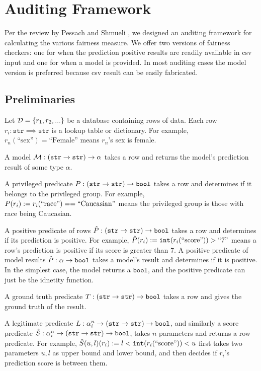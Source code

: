 \documentclass[conference]{IEEEtran}
\begin{document}
\section{Auditing Framework}
\label{sec:framework}
Per the review by Pessach and Shmueli \cite{pessach2022review}, we designed an auditing framework for calculating the various fairness measure. We offer two versions of fairness checkers: one for when the prediction positive results are readily available in csv input and one for when a model is provided. In most auditing cases the model version is preferred because csv result can be easily fabricated.

\subsection{Preliminaries}
Let $\mathcal{D} = \{r_1, r_2, ...\}$ be a database containing rows of data. Each row $r_i : \mathtt{str} \implies \mathtt{str}$ is a lookup table or dictionary. For example, $r_n(\text{``sex''}) = \text{``Female''}$ means $r_n$'s sex is female.

A model $\mathcal{M} : (\mathtt{str} \rightarrow \mathtt{str}) \rightarrow \alpha$ takes a row and returns the model's prediction result of some type $\alpha$.

A privileged predicate $P : (\mathtt{str} \rightarrow \mathtt{str}) \rightarrow \mathtt{bool}$ takes a row and determines if it belongs to the privileged group. For example, $P(r_i) := r_i(\text{``race''}) == \text{``Caucasian''}$ means the privileged group is those with race being Caucasian.

A positive predicate of rows $\hat{P} : (\mathtt{str} \rightarrow \mathtt{str}) \rightarrow \mathtt{bool}$ takes a row and determines if its prediction is positive. For example, $\hat{P}(r_i) := \mathtt{int}(r_i(\text{``score''})) > \text{``7''}$ means a row's prediction is positive if its score is greater than 7. A positive predicate of model results $\hat{P} : \alpha \rightarrow \mathtt{bool}$ takes a model's result and determines if it is positive. In the simplest case, the model returns a $\mathtt{bool}$, and the positive predicate can just be the idnetity function.

A ground truth predicate $T : (\mathtt{str} \rightarrow \mathtt{str}) \rightarrow \mathtt{bool}$ takes a row and gives the ground truth of the result.

A legitimate predicate $L : \alpha_i^n \rightarrow (\mathtt{str} \rightarrow \mathtt{str}) \rightarrow \mathtt{bool}$, and similarly a score predicate $\hat{S} : \alpha_i^n \rightarrow (\mathtt{str} \rightarrow \mathtt{str}) \rightarrow \mathtt{bool}$, takes $n$ parameters and returns a row predicate. For example, $\hat{S}(u, l)(r_i) := l < \mathtt{int}(r_i(\text{``score''})) < u$ first takes two parameters $u,l$ as upper bound and lower bound, and then decides if $r_i$'s prediction score is between them.
\end{document}
